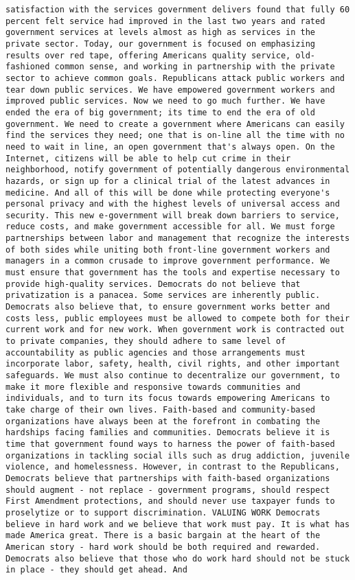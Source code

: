\documentclass[
]{article}
\begin{document}
\begin{verbatim}
satisfaction with the services government delivers found that fully 60 percent felt service had improved in the last two years and rated government services at levels almost as high as services in the private sector. Today, our government is focused on emphasizing results over red tape, offering Americans quality service, old-fashioned common sense, and working in partnership with the private sector to achieve common goals. Republicans attack public workers and tear down public services. We have empowered government workers and improved public services. Now we need to go much further. We have ended the era of big government; its time to end the era of old government. We need to create a government where Americans can easily find the services they need; one that is on-line all the time with no need to wait in line, an open government that's always open. On the Internet, citizens will be able to help cut crime in their neighborhood, notify government of potentially dangerous environmental hazards, or sign up for a clinical trial of the latest advances in medicine. And all of this will be done while protecting everyone's personal privacy and with the highest levels of universal access and security. This new e-government will break down barriers to service, reduce costs, and make government accessible for all. We must forge partnerships between labor and management that recognize the interests of both sides while uniting both front-line government workers and managers in a common crusade to improve government performance. We must ensure that government has the tools and expertise necessary to provide high-quality services. Democrats do not believe that privatization is a panacea. Some services are inherently public. Democrats also believe that, to ensure government works better and costs less, public employees must be allowed to compete both for their current work and for new work. When government work is contracted out to private companies, they should adhere to same level of accountability as public agencies and those arrangements must incorporate labor, safety, health, civil rights, and other important safeguards. We must also continue to decentralize our government, to make it more flexible and responsive towards communities and individuals, and to turn its focus towards empowering Americans to take charge of their own lives. Faith-based and community-based organizations have always been at the forefront in combating the hardships facing families and communities. Democrats believe it is time that government found ways to harness the power of faith-based organizations in tackling social ills such as drug addiction, juvenile violence, and homelessness. However, in contrast to the Republicans, Democrats believe that partnerships with faith-based organizations should augment - not replace - government programs, should respect First Amendment protections, and should never use taxpayer funds to proselytize or to support discrimination. VALUING WORK Democrats believe in hard work and we believe that work must pay. It is what has made America great. There is a basic bargain at the heart of the American story - hard work should be both required and rewarded. Democrats also believe that those who do work hard should not be stuck in place - they should get ahead. And 
\end{verbatim}
\end{document}
